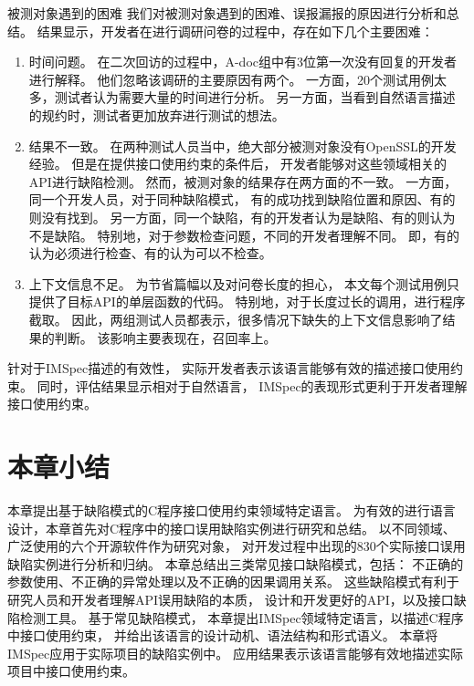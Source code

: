 {\kaishu 被测对象遇到的困难 }
我们对被测对象遇到的困难、误报漏报的原因进行分析和总结。
结果显示，开发者在进行调研问卷的过程中，存在如下几个主要困难：
\begin{enumerate}
	\item 时间问题。
	在二次回访的过程中，A-doc组中有3位第一次没有回复的开发者进行解释。
	他们忽略该调研的主要原因有两个。
	一方面，20个测试用例太多，测试者认为需要大量的时间进行分析。
	另一方面，当看到自然语言描述的规约时，测试者更加放弃进行测试的想法。
	\item 结果不一致。
	在两种测试人员当中，绝大部分被测对象没有OpenSSL的开发经验。
	但是在提供接口使用约束的条件后，
	开发者能够对这些领域相关的API进行缺陷检测。
	然而，被测对象的结果存在两方面的不一致。
	一方面，同一个开发人员，对于同种缺陷模式，
	有的成功找到缺陷位置和原因、有的则没有找到。
	另一方面，同一个缺陷，有的开发者认为是缺陷、有的则认为不是缺陷。
	特别地，对于参数检查问题，不同的开发者理解不同。
	即，有的认为必须进行检查、有的认为可以不检查。
	\item 上下文信息不足。
	为节省篇幅以及对问卷长度的担心，
	本文每个测试用例只提供了目标API的单层函数的代码。
	特别地，对于长度过长的调用，进行程序截取。
	因此，两组测试人员都表示，很多情况下缺失的上下文信息影响了结果的判断。
	该影响主要表现在，召回率上。
\end{enumerate}
	
针对于IMSpec描述的有效性，
实际开发者表示该语言能够有效的描述接口使用约束。
同时，评估结果显示相对于自然语言，
IMSpec的表现形式更利于开发者理解接口使用约束。

\section{本章小结}
\label{sec:2.6}
本章提出基于缺陷模式的C程序接口使用约束领域特定语言。
为有效的进行语言设计，本章首先对C程序中的接口误用缺陷实例进行研究和总结。
以不同领域、广泛使用的六个开源软件作为研究对象，
对开发过程中出现的830个实际接口误用缺陷实例进行分析和归纳。
本章总结出三类常见接口缺陷模式，包括：
不正确的参数使用、不正确的异常处理以及不正确的因果调用关系。
这些缺陷模式有利于研究人员和开发者理解API误用缺陷的本质，
设计和开发更好的API，以及接口缺陷检测工具。
基于常见缺陷模式，
本章提出IMSpec领域特定语言，以描述C程序中接口使用约束，
并给出该语言的设计动机、语法结构和形式语义。
本章将IMSpec应用于实际项目的缺陷实例中。
应用结果表示该语言能够有效地描述实际项目中接口使用约束。
